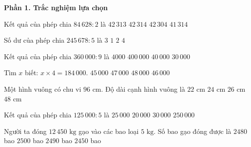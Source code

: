 \textbf{Phần 1. Trắc nghiệm lựa chọn}

\begin{ex} %
Kết quả của phép chia $84\,628 : 2$ là
\choice
{$42\,313$}
{\True $42\,314$}
{$42\,304$}
{$41\,314$}
\end{ex}

\begin{ex} %
Số dư của phép chia $245\,678 : 5$ là
\choice
{\True $3$}
{$1$}
{$2$}
{$4$}
\end{ex}

\begin{ex} %
Kết quả của phép chia $360\,000 : 9$ là
\choice
{$4000$}
{$400\,000$}
{\True $40\,000$}
{$30\,000$}
\end{ex}

\begin{ex} %
Tìm $x$ biết: $x \times 4 = 184\,000$.
\choice
{$45\,000$}
{$47\,000$}
{$48\,000$}
{\True $46\,000$}
\end{ex}

\begin{ex} %
Một hình vuông có chu vi $96\text{ cm}$. Độ dài cạnh hình vuông là
\choice
{$22\text{ cm}$}
{\True $24\text{ cm}$}
{$26\text{ cm}$}
{$48\text{ cm}$}
\end{ex}

\begin{ex} %
Kết quả của phép chia $125\,000 : 5$ là
\choice
{\True $25\,000$}
{$20\,000$}
{$30\,000$}
{$250\,000$}
\end{ex}

\begin{ex} %
Người ta đóng $12\,450\text{ kg}$ gạo vào các bao loại $5\text{ kg}$. Số bao gạo đóng được là
\choice
{$2480$ bao}
{$2500$ bao}
{\True $2490$ bao}
{$2450$ bao}
\end{ex}

